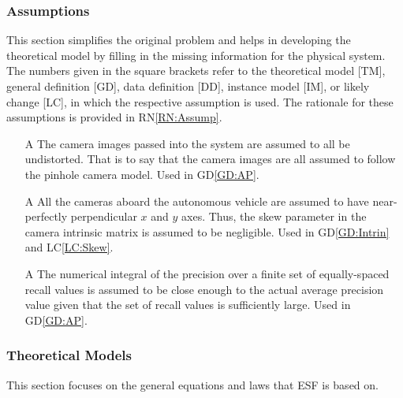 \documentclass[12pt]{article}
\newcommand{\dref}[1]{GD\ref{#1}}
\newcounter{assumpnum} %
\newcommand{\lcref}[1]{LC\ref{#1}}
\newcommand{\rnref}[1]{RN\ref{#1}}
\newcommand{\ProjectName}{ESF }
\begin{document}
\subsubsection{Assumptions} \label{sec_assumpt}

This section simplifies the original problem and helps in developing the
theoretical model by filling in the missing information for the physical system.
The numbers given in the square brackets refer to the theoretical model [TM],
general definition [GD], data definition [DD], instance model [IM], or likely
change [LC], in which the respective assumption is used. The rationale for these
assumptions is provided in \rnref{RN:Assump}.

\begin{itemize}

\item[A\refstepcounter{assumpnum}\theassumpnum \label{assump:distortion}] The camera images
passed into the system are assumed to all be undistorted. That is to say that the camera images
are all assumed to follow the pinhole camera model. Used in \dref{GD:AP}.

\item[A\refstepcounter{assumpnum}\theassumpnum \label{assump:skew}] All the cameras aboard the
autonomous vehicle are assumed to have near-perfectly perpendicular $x$ and $y$ axes. Thus, the skew parameter
in the camera intrinsic matrix is assumed to be negligible. Used in \dref{GD:Intrin} and \lcref{LC:Skew}.

\item[A\refstepcounter{assumpnum}\theassumpnum \label{assump:avgprec}] The numerical integral of the precision over
a finite set of equally-spaced recall values is assumed to be close enough to the actual average precision value given 
that the set of recall values is sufficiently large. Used in \dref{GD:AP}.


\end{itemize}

\subsubsection{Theoretical Models}\label{sec_theoretical}

This section focuses on the general equations and laws that \ProjectName is based
on.


~\newline
\end{document}
